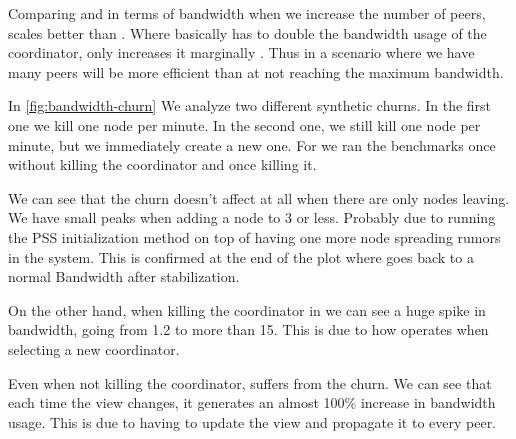 Comparing \epto and \jgroups in terms of bandwidth when we increase the number of peers, \epto scales better than \jgroups. Where \jgroups basically has to double the bandwidth usage of the coordinator, \epto only increases it marginally . Thus in a scenario where we have many peers \epto will be more efficient than \jgroups at not reaching the maximum bandwidth.

% 	

In \autoref{fig:bandwidth-churn} We analyze two different synthetic churns. In the first one we kill one node per minute. In the second one, we still kill one node per minute, but we immediately create a new one. For \jgroups we ran the benchmarks once without killing the coordinator and once killing it.

We can see that the churn doesn't affect  \epto at all when there are only nodes leaving. We have small peaks when adding a node to \SI{3}{\mbps} or less. Probably due to running the PSS initialization method on top of having one more node spreading rumors in the system. This is confirmed at the end of the plot where \epto goes back to a normal Bandwidth after stabilization.

On the other hand, when killing the coordinator in \jgroups we can see a huge spike in bandwidth, going from \SI{1.2}{\mbps} to more than \SI{15}{\mbps}. This is due to how \jgroups operates when selecting a new coordinator.

Even when not killing the coordinator, \jgroups suffers from the churn. We can see that each time the view changes, it generates an almost 100\% increase in bandwidth usage. This is due to \jgroups having to update the view and propagate it to every peer.

